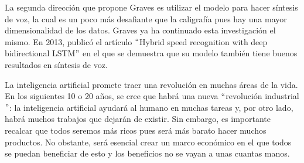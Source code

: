 \vspace{1em}

La segunda dirección que propone Graves es utilizar el modelo para hacer síntesis de voz, la cual es un poco más desafiante que la caligrafía pues hay una mayor dimensionalidad de los datos. Graves ya ha continuado esta investigación el mismo. En 2013, publicó el artículo $``$Hybrid speed recognition with deep bidirectional LSTM$"$ en el que se demuestra que su modelo también tiene buenos resultados en síntesis de voz.
\cite{DBLP:journals/corr/Graves13}

\vspace{1em}

La inteligencia artificial promete traer una revolución en muchas áreas de la vida. En los siguientes 10 o 20 años, se cree que habrá una nueva $``$revolución industrial$"$: la inteligencia artificial ayudará al humano en muchas tareas y, por otro lado, habrá muchos trabajos que dejarán de existir. Sin embargo, es importante recalcar que todos seremos más ricos pues será más barato hacer muchos productos. No obstante, será esencial crear un marco económico en el que todos se puedan beneficiar de esto y los beneficios no se vayan a unas cuantas manos. 
\cite{goodfellow-et-al-2016}

